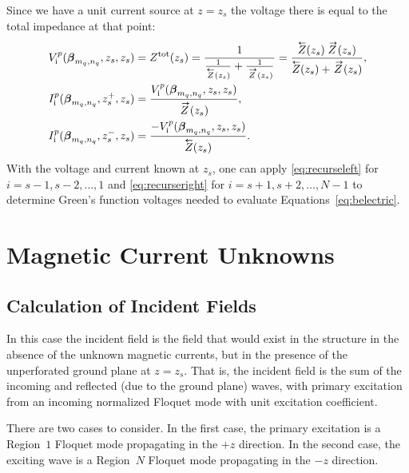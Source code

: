 Since we have a unit current source at $z=z_s$ the
voltage there is equal to the total impedance at that point:
\begin{subequations}
\begin{align}
  \Vi^p(\vecbeta_{m_q,n_q},z_s,z_s) &= 
  Z^{\text{tot}}(z_s) = 
  \frac{1}{\frac{1}{\Zleft(z_s)} + \frac{1}{\Zright(z_s)}}
  =
  \frac{\Zleft(z_s) \, \Zright(z_s)}{\Zleft(z_s) + \Zright(z_s)}, \\
  \Ii^p(\vecbeta_{m_q,n_q},z_s^+,z_s) &=
  \frac{\Vi^p(\vecbeta_{m_q,n_q},z_s,z_s)}{\Zright(z_s)}, \\
  \Ii^p(\vecbeta_{m_q,n_q},z_s^-,z_s) &=
  \frac{-\Vi^p(\vecbeta_{m_q,n_q},z_s,z_s)}{\Zleft(z_s)}. 
\end{align}
\end{subequations}
With the voltage and current known at $z_s$, one can apply 
\eqref{eq:recurseleft} for $i=s-1, s-2, \ldots, 1$ and 
\eqref{eq:recurseright} for $i=s+1, s+2, \ldots, N-1$ to determine
Green's function voltages needed to evaluate Equations~\eqref{eq:belectric}.

\section{Magnetic Current Unknowns}
\subsection{Calculation of Incident Fields}
In this case the incident field is the field that would exist in the
 structure in the absence of the unknown magnetic currents, but in the
 presence of the unperforated ground plane at $z=z_s.$
 That is, the incident field is the sum of the incoming and reflected
 (due to the ground plane) waves, with primary excitation
 from an incoming normalized Floquet mode with unit excitation
 coefficient.

 There are two cases to consider.  In the first case, the primary excitation
 is a Region~$1$ Floquet mode propagating in the $+z$ direction.  
 In the second case, the exciting wave is a Region~$N$ Floquet mode
 propagating in the  $-z$ direction.


